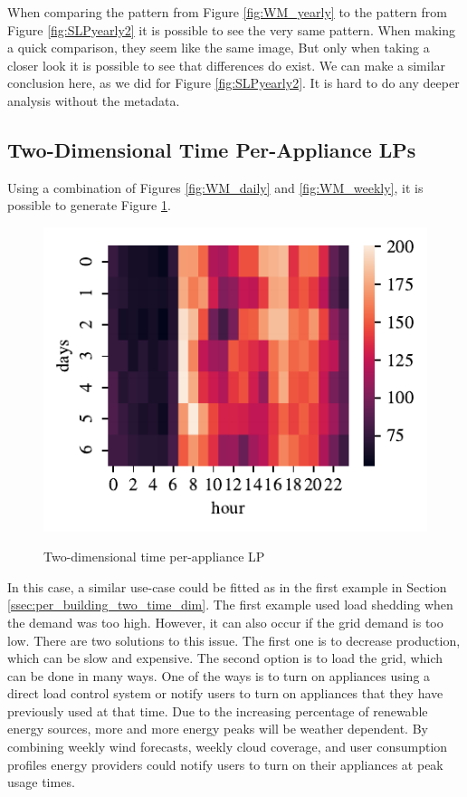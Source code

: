 When comparing the pattern from Figure \ref{fig:WM_yearly} to the pattern from Figure \ref{fig:SLPyearly2} 
it is possible to see the very same pattern. When making a quick comparison, they seem like the same image,
But only when taking a closer look it is possible to see that differences do exist. 
We can make a similar conclusion here, as we did for Figure \ref{fig:SLPyearly2}.
It is hard to do any deeper analysis without the metadata.

\subsection{Two-Dimensional Time Per-Appliance LPs}

Using a combination of Figures \ref{fig:WM_daily} and \ref{fig:WM_weekly},
it is possible to generate Figure \ref{fig:wm_hm_weekly}.

\begin{figure}[H]
	\centering
	\caption{Two-dimensional time per-appliance LP}
	\includegraphics[]{../Figures/LPS/wm_hm_weekly.pdf}
	\label{fig:wm_hm_weekly}
\end{figure}
 
In this case, a similar use-case could be fitted as in the first example in Section \ref{ssec:per_building_two_time_dim}.
The first example used load shedding when the demand was too high.
However, it can also occur if the grid demand is too low.
There are two solutions to this issue.
The first one is to decrease production, which can be slow and expensive.
The second option is to load the grid, which can be done in many ways.
One of the ways is to turn on appliances using a direct load control system or notify users to turn on appliances that they have previously used at that time. 
Due to the increasing percentage of renewable energy sources, more and more energy peaks will be weather dependent.
By combining weekly wind forecasts, weekly cloud coverage, and user consumption profiles energy providers could notify users to turn on their appliances at peak usage times.


